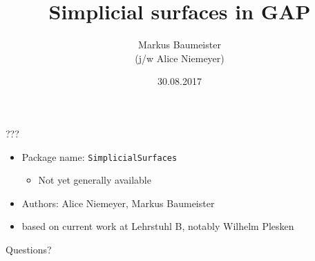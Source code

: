 \documentclass[11pt, handout]{beamer}
\author[Baumeister]{Markus Baumeister\\ \vspace{1mm} \small{(j/w Alice Niemeyer)}}
\title{Simplicial surfaces in GAP}
\institute[Aachen]{Lehrstuhl B für Mathematik\\RWTH Aachen University}
\date{30.08.2017}
\begin{document}
\begin{frame}
\titlepage
\end{frame}

\begin{frame}{???}
    \begin{itemize}
        \pause
        \item Package name: \texttt{SimplicialSurfaces}
            \begin{itemize}
                \pause
                \item Not yet generally available
            \end{itemize}
        \pause
        \item Authors: Alice Niemeyer, Markus Baumeister
        \pause
        \item based on current work at Lehrstuhl B, notably Wilhelm Plesken
    \end{itemize}
\end{frame}


\begin{frame}
    \tableofcontents[pausesections]
\end{frame}



            




\begin{frame}{Questions?}
    
\end{frame}
\end{document}
